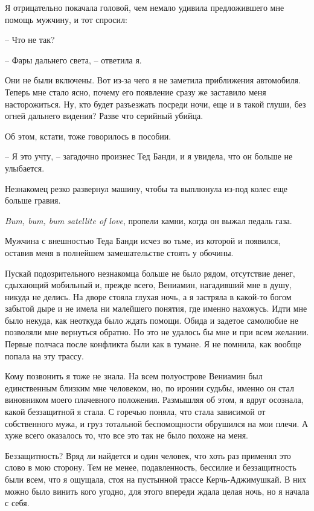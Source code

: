\documentclass[
]{book}
\begin{document}
Я отрицательно покачала головой, чем немало удивила предложившего мне помощь мужчину, и тот спросил:

-- Что не так?

-- Фары дальнего света, -- ответила я.

Они не были включены. Вот из-за чего я не заметила приближения автомобиля. Теперь мне стало ясно, почему его появление сразу же заставило меня насторожиться. Ну, кто будет разъезжать посреди ночи, еще и в такой глуши, без огней дальнего видения? Разве что серийный убийца.

Об этом, кстати, тоже говорилось в пособии.

-- Я это учту, -- загадочно произнес Тед Банди, и я увидела, что он больше не улыбается.

Незнакомец резко развернул машину, чтобы та выплюнула из-под колес еще больше гравия.

\emph{Bum, bum, bum satellite of love}, пропели камни, когда он выжал педаль газа.

Мужчина с внешностью Теда Банди исчез во тьме, из которой и появился, оставив меня в полнейшем замешательстве стоять у обочины.

Пускай подозрительного незнакомца больше не было рядом, отсутствие денег, сдыхающий мобильный и, прежде всего, Вениамин, нагадивший мне в душу, никуда не делись. На дворе стояла глухая ночь, а я застряла в какой-то богом забытой дыре и не имела ни малейшего понятия, где именно нахожусь. Идти мне было некуда, как неоткуда было ждать помощи. Обида и задетое самолюбие не позволяли мне вернуться обратно. Но это не удалось бы мне и при всем желании. Первые полчаса после конфликта были как в тумане. Я не помнила, как вообще попала на эту трассу.

Кому позвонить я тоже не знала. На всем полуострове Вениамин был единственным близким мне человеком, но, по иронии судьбы, именно он стал виновником моего плачевного положения. Размышляя об этом, я вдруг осознала, какой беззащитной я стала. С горечью поняла, что стала зависимой от собственного мужа, и груз тотальной беспомощности обрушился на мои плечи. А хуже всего оказалось то, что все это так не было похоже на меня.

Беззащитность? Вряд ли найдется и один человек, что хоть раз применял это слово в мою сторону. Тем не менее, подавленность, бессилие и беззащитность были всем, что я ощущала, стоя на пустынной трассе Керчь-Аджимушкай. В них можно было винить кого угодно, для этого впереди ждала целая ночь, но я начала с себя.
\end{document}

